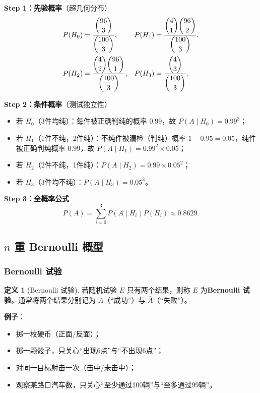 \documentclass[11pt,a4paper]{report}
\theoremstyle{definition}
\newtheorem{definition}{定义}[chapter]
\begin{document}
\textbf{Step 1：先验概率}（超几何分布）
\[
\begin{aligned}
P(H_0) &= \frac{\dbinom{96}{3}}{\dbinom{100}{3}}, &
P(H_1) &= \frac{\dbinom{4}{1}\dbinom{96}{2}}{\dbinom{100}{3}}, \\
P(H_2) &= \frac{\dbinom{4}{2}\dbinom{96}{1}}{\dbinom{100}{3}}, &
P(H_3) &= \frac{\dbinom{4}{3}}{\dbinom{100}{3}}.
\end{aligned}
\]

\textbf{Step 2：条件概率}（测试独立性）
\begin{itemize}[leftmargin=2em]
    \item 若 $H_0$（3件均纯）：每件被正确判纯的概率 $0.99$，故 $P(A \mid H_0) = 0.99^3$；
    \item 若 $H_1$（1件不纯，2件纯）：不纯件被漏检（判纯）概率 $1-0.95=0.05$，纯件被正确判纯概率 $0.99$，故 $P(A \mid H_1) = 0.99^2 \times 0.05$；
    \item 若 $H_2$（2件不纯，1件纯）：$P(A \mid H_2) = 0.99 \times 0.05^2$；
    \item 若 $H_3$（3件均不纯）：$P(A \mid H_3) = 0.05^3$。
\end{itemize}

\textbf{Step 3：全概率公式}
\[
P(A) = \sum_{i=0}^{3} P(A \mid H_i) P(H_i) \approx \boxed{0.8629}.
\]

\subsection{\texorpdfstring{$n$}{n} 重 Bernoulli 概型}

\subsubsection{Bernoulli 试验}

\begin{definition}[Bernoulli 试验]
若随机试验 $E$ 只有两个结果，则称 $E$ 为\textbf{Bernoulli 试验}。通常将两个结果分别记为 $A$（``成功''）与 $\bar{A}$（``失败''）。
\end{definition}

\textbf{例子}：
\begin{itemize}[leftmargin=2em]
    \item 掷一枚硬币（正面/反面）；
    \item 掷一颗骰子，只关心``出现6点''与``不出现6点''；
    \item 对同一目标射击一次（击中/未击中）；
    \item 观察某路口汽车数，只关心``至少通过100辆''与``至多通过99辆''。
\end{itemize}
\end{document}
